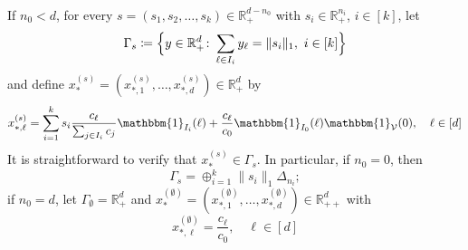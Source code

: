 \documentclass[10pt]{amsart}
\numberwithin{equation}{section}
\theoremstyle{plain}
\theoremstyle{definition}
\theoremstyle{remark}
\newcommand{\cI}{I}
\newcommand{\cV}{\mathcal{V}}
\begin{document}
If $n_0<d$, for every $s=(s_1,s_2,\ldots,s_k)\in\mathbb{R}^{d-n_0}_{+}$ with $s_{i}\in\mathbb{R}^{n_i}_{+}$,  $i\in[k]$, let
 $$\Gamma_s\coloneqq\Bigl\{y\in\mathbb{R}^d_+
\colon \sum_{\ell\in\cI_i}y_{\ell}=\|s_i\|_1,\ i\in[k]\Bigr\}$$
and define $x_*^{(s)}=(x_{*,1}^{(s)},\ldots,x_{*,d}^{(s)})\in\mathbb{R}^d_{+}$ by
\begin{equation}\label{eq:expression-of-positive-equilibrium}
x_{*,\ell}^{(s)}=\sum_{i=1}^ks_i\frac{c_{\ell}}{\sum_{j\in\cI_i}c_j}\mathbbm{1}_{\cI_i}(\ell)+ \frac{c_{\ell}}{c_0}\mathbbm{1}_{\cI_0}(\ell)\mathbbm{1}_{\cV}(0),\quad \ell\in[d]
\end{equation}
It is straightforward to verify that $x_*^{(s)}\in\Gamma_s$. In particular, if $n_0=0$, then $$\Gamma_s=\oplus_{i=1}^k\|s_i\|_1\Delta_{n_i};$$ 
if $n_0=d$,  let $\Gamma_{\emptyset}=\mathbb{R}^d_+$ and $x_*^{(\emptyset)}=(x_{*,1}^{(\emptyset)},\ldots,x_{*,d}^{(\emptyset)})\in\mathbb{R}^d_{++}$ with
\begin{equation}\label{eq:expression-of-positive-equilibrium-non-singular}
x_{*,\ell}^{(\emptyset)}=\frac{c_{\ell}}{c_0},\quad \ell\in[d]\end{equation}
\end{document}
